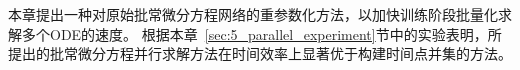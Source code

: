 
本章提出一种对原始批常微分方程网络的重参数化方法，以加快训练阶段批量化求解多个ODE的速度。
根据本章~\ref{sec:5_parallel_experiment}节中的实验表明，所提出的批常微分方程并行求解方法在时间效率上显著优于构建时间点并集的方法。


